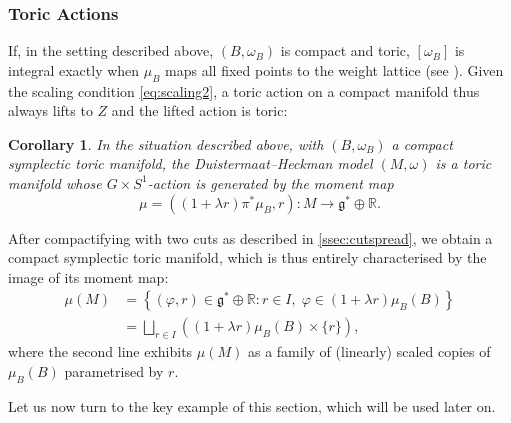 \documentclass[10pt,oneside,reqno]{amsart}
\newtheorem{corollary}[theorem]{Corollary}
\theoremstyle{definition}
\newcommand{\fg}{\mathfrak{g}}
\newcommand{\IR}{\mathbb{R}}
\begin{document}
\subsubsection*{Toric Actions}
If, in the setting described above, $(B,\omega_B)$ is compact and toric, $[\omega_B]$ is integral exactly when $\mu_B$ maps all fixed points to the weight lattice (see \cite[Exercises 3.6 and 3.7]{guillemin2012moment}). Given the scaling condition \eqref{eq:scaling2}, a toric action on a compact manifold thus always lifts to $Z$ and the lifted action is toric: 

\begin{corollary}
    In the situation described above, with $(B,\omega_B)$  a compact symplectic toric manifold, the Duistermaat--Heckman model $(M,\omega)$ is a toric manifold whose $G\times S^1$-action is generated by the moment map $$\mu=((1+\lambda r)\pi^*\mu_B,r):M \to \fg^*\oplus \IR.$$
\end{corollary}

After compactifying with two cuts as described in \cref{ssec:cutspread}, we obtain a compact symplectic toric manifold, which is thus entirely characterised by the image of its moment map:
\begin{align*}
    \mu(M) &= \left\{ (\varphi,r)\in \fg^*\oplus \IR : r\in I,\; \varphi\in (1+\lambda r)\mu_B(B)\right\} \\
    &= \bigsqcup_{r\in I}\left((1+\lambda r)\mu_B(B) \times \{r\}\right),
\end{align*}
where the second line exhibits $\mu(M)$ as a family of (linearly) scaled copies of $\mu_B(B)$ parametrised by $r$. \smallskip 

Let us now turn to the key example of this section, which will be used later on.
\end{document}
